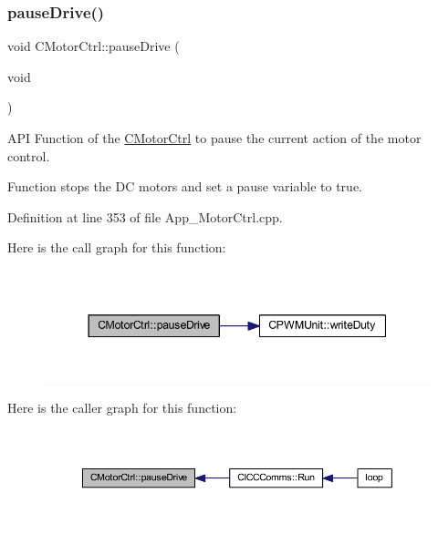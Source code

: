 \subsubsection{\texorpdfstring{pause\+Drive()}{pauseDrive()}}
{\footnotesize\ttfamily void C\+Motor\+Ctrl\+::pause\+Drive (\begin{DoxyParamCaption}\item[{void}]{ }\end{DoxyParamCaption})}



A\+PI Function of the \mbox{\hyperlink{class_c_motor_ctrl}{C\+Motor\+Ctrl}} to pause the current action of the motor control. 

Function stops the DC motors and set a pause variable to true. 

Definition at line 353 of file App\+\_\+\+Motor\+Ctrl.\+cpp.

Here is the call graph for this function\+:
\nopagebreak
\begin{figure}[H]
\begin{center}
\leavevmode
\includegraphics[width=344pt]{class_c_motor_ctrl_af3e047be659fb9f49f1644ba2eca4684_cgraph}
\end{center}
\end{figure}
Here is the caller graph for this function\+:
\nopagebreak
\begin{figure}[H]
\begin{center}
\leavevmode
\includegraphics[width=350pt]{class_c_motor_ctrl_af3e047be659fb9f49f1644ba2eca4684_icgraph}
\end{center}
\end{figure}
\mbox{\label{class_c_motor_ctrl_a8a76501cf8eaa85c5131bde5f33b6699}} 
